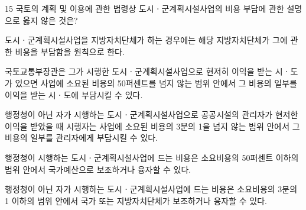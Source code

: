 \begin{question}{15}
국토의 계획 및 이용에 관한 법령상 도시ㆍ군계획시설사업의 비용 부담에 관한 설명으로 옳지 않은 것은?
\begin{choices}
  \item 도시ㆍ군계획시설사업을 지방자치단체가 하는 경우에는 해당 지방자치단체가 그에 관한 비용을 부담함을 원칙으로 한다.
  \item 국토교통부장관은 그가 시행한 도시ㆍ군계획시설사업으로 현저히 이익을 받는 시ㆍ도가 있으면 사업에 소요된 비용의 50퍼센트를 넘지 않는 범위 안에서 그 비용의 일부를 이익을 받는 시ㆍ도에 부담시킬 수 있다.
  \item 행정청이 아닌 자가 시행하는 도시ㆍ군계획시설사업으로 공공시설의 관리자가 현저한 이익을 받았을 때 시행자는 사업에 소요된 비용의 3분의 1을 넘지 않는 범위 안에서 그 비용의 일부를 관리자에게 부담시킬 수 있다.
  \item 행정청이 시행하는 도시ㆍ군계획시설사업에 드는 비용은 소요비용의 50퍼센트 이하의 범위 안에서 국가예산으로 보조하거나 융자할 수 있다.
  \item 행정청이 아닌 자가 시행하는 도시ㆍ군계획시설사업에 드는 비용은 소요비용의 3분의 1 이하의 범위 안에서 국가 또는 지방자치단체가 보조하거나 융자할 수 있다.
\end{choices}
\end{question}
